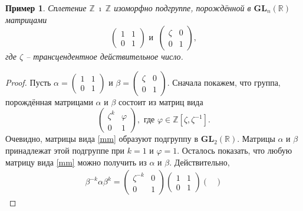 \documentclass{article}
\newtheorem{example}{Пример}[section]
\begin{document}
\begin{example}
    Сплетение $\mathbb{Z} \ \imath \ \mathbb{Z}$ изоморфно подгруппе, порождённой в $\mathbf{GL}_n(\mathbb{R})$ матрицами
    \[
        \begin{pmatrix}
            1 & 1 \\
            0 & 1
        \end{pmatrix} \text{ и } \
        \begin{pmatrix}
            \zeta & 0 \\
            0 & 1
        \end{pmatrix},
    \]
    где $\zeta$ -- трансцендентное действительное число.
\end{example}
\begin{proof}
    Пусть 
    $
        \alpha = 
        \begin{pmatrix}
            1 & 1 \\
            0 & 1
        \end{pmatrix}
    $ и
    $
        \beta =
        \begin{pmatrix}
            \zeta & 0 \\
            0 & 1
        \end{pmatrix}
    $.
    Сначала покажем, что группа, порождённая матрицами $\alpha$ и $\beta$ состоит из матриц вида
    \begin{equation} \tag{*} \label{mm}
        \begin{pmatrix}
            \zeta^k & \varphi \\
            0 & 1
        \end{pmatrix},
        \text{ где } \varphi \in \mathbb{Z}\left[ \zeta, \zeta^{-1} \right].
    \end{equation}
    Очевидно, матрицы вида \eqref{mm} образуют подгруппу в $\mathbf{GL}_2(\mathbb{R})$. Матрицы $\alpha$ и $\beta$ принадлежат этой подгруппе при $k = 1$ и $\varphi = 1$. Осталось показать, что любую матрицу вида \eqref{mm} можно получить из $\alpha$ и $\beta$. Действительно,
    \begin{multline*}
        \beta^{-k} \alpha \beta^k =
        \begin{pmatrix}
            \zeta^{-k} & 0 \\
            0 & 1
        \end{pmatrix}
        \begin{pmatrix}
            1 & 1 \\
            0 & 1
        \end{pmatrix}
        \begin{pmatrix}

\end{pmatrix}
\end{multline*}
\end{proof}
\end{document}
